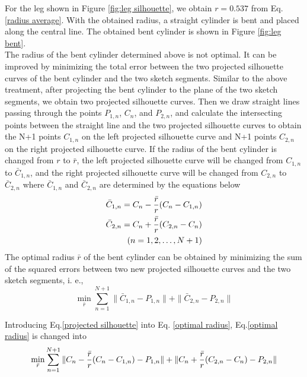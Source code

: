 \documentclass[runningheads]{llncs}
\begin{document}
For the leg shown in Figure \ref{fig:leg silhouette}, we obtain $r=0.537$ from Eq. \eqref{radius average}. With the obtained radius, a straight cylinder is bent and placed along the central line. The obtained bent cylinder is shown in Figure \ref{fig:leg bent}. \\
The radius of the bent cylinder determined above is not optimal. It can be improved by minimizing the total error between the two projected silhouette curves of the bent cylinder and the two sketch segments. Similar to the above treatment, after projecting the bent cylinder to the plane of the two sketch segments, we obtain two projected silhouette curves. Then we draw straight lines passing through the points $P_{1,n}$, $C_n$, and $P_{2,n}$, and calculate the intersecting points between the straight line and the two projected silhouette curves to obtain the N+1 points $C_{1,n}$ on the left projected silhouette curve and N+1 points $C_{2,n}$ on the right projected silhouette curve. If the radius of the bent cylinder is changed from $r$ to $\bar{r}$, the left projected silhouette curve will be changed from $C_{1,n}$ to $\bar{C}_{1,n}$, and the right projected silhouette curve will be changed from $C_{2,n}$ to $\bar{C}_{2,n}$ where $\bar{C}_{1,n}$ and $\bar{C}_{2,n}$ are determined by the equations below
\begin{equation}
    \begin{split}
        \Bar{C}_{1,n}=C_n-\frac{\Bar{r}}{r}(C_n-C_{1,n}) \\
        \Bar{C}_{2,n}=C_n+\frac{\Bar{r}}{r}(C_{2,n}-C_n) \\
        (n=1,2,\ldots,N+1)
    \end{split}
    \label{projected silhouette}
\end{equation}
The optimal radius $\bar{r}$ of the bent cylinder can be obtained by minimizing the sum of the squared errors between two new projected silhouette curves and the two sketch segments, i. e., 
\begin{equation}
    \min_{\bar{r}}\sum_{n=1}^{N+1}\|\bar{C}_{1,n}-P_{1,n}\|+\|\bar{C}_{2,n}-P_{2,n}\|
    \label{optimal radius}
\end{equation}

Introducing Eq.\eqref{projected silhouette} into Eq. \eqref{optimal radius}, Eq.\eqref{optimal radius} is changed into
\begin{equation}
    \min_{\Bar{r}}\sum_{n=1}^{N+1}\|C_n-\frac{\bar{r}}{r}(C_n-C_{1,n})-P_{1,n}\|+\|C_n+\frac{\bar{r}}{r}(C_{2,n}-C_n)-P_{2,n}\|
    \label{optimal radius expand}
\end{equation}
\end{document}
